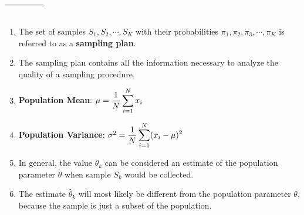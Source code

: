 \begin{customArrayStretch}{1.3}
\begin{longtable}{>{\RaggedRight\arraybackslash}p{4cm} >{\centering\arraybackslash}p{0.5cm} p{10.5cm}}
\begin{minipage}{10.3cm}
\begin{enumerate}[itemsep=0.2cm]
        \end{enumerate}
        \vspace{0.15cm}
    \end{minipage} 
    \\ \hline





\end{longtable}
\end{customArrayStretch}


\begin{enumerate}[itemsep=0.2cm]
    \item The set of samples $S_1, S_2,\cdots, S_K$ with their probabilities $\pi_1, \pi_2, \pi_3,\cdots,\pi_K$ is referred to as a \textbf{sampling plan}.
    \hfill \cite{statistics/book/Statistics-for-Data-Scientists/Maurits-Kaptein}

    \item The sampling plan contains all the information necessary to analyze the quality of a sampling procedure.
    \hfill \cite{statistics/book/Statistics-for-Data-Scientists/Maurits-Kaptein}

    \item \textbf{Population Mean}: \hspace{2cm} $
        \mu
        = \dfrac{1}{N}\displaystyle\sum_{i=1}^N x_i
    $
    \hfill \cite{statistics/book/Statistics-for-Data-Scientists/Maurits-Kaptein}

    \item \textbf{Population Variance}: \hspace{2cm} $
        \sigma^2
        = \dfrac{1}{N}\displaystyle\sum_{i=1}^N (x_i - \mu)^2
    $
    \hfill \cite{statistics/book/Statistics-for-Data-Scientists/Maurits-Kaptein}

    \item In general, the value $\hat{\theta}_k$ can be considered an estimate of the population parameter $\theta$ when sample $S_k$ would be collected. 
    \hfill \cite{statistics/book/Statistics-for-Data-Scientists/Maurits-Kaptein}
    
    \item The estimate $\hat{\theta}_k$ will most likely be different from the population parameter $\theta$, because the sample is just a subset of the population. 
    \hfill \cite{statistics/book/Statistics-for-Data-Scientists/Maurits-Kaptein}

    
\end{enumerate}

















